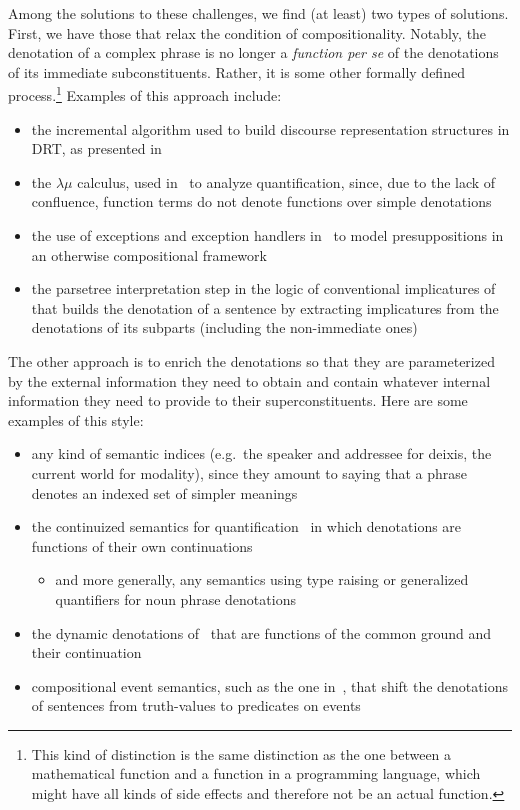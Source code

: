 \documentclass{llncs}
\begin{document}
Among the solutions to these challenges, we find (at least) two types of
solutions. First, we have those that relax the condition of
compositionality. Notably, the denotation of a complex phrase is no longer
a \emph{function per se} of the denotations of its immediate
subconstituents. Rather, it is some other formally defined
process.\footnote{This kind of distinction is the same distinction as the
  one between a mathematical function and a function in a programming
  language, which might have all kinds of side effects and therefore not be
  an actual function.} Examples of this approach include:

\begin{itemize}
\item the incremental algorithm used to build discourse representation
  structures in DRT, as presented in~\cite{kamp1993discourse}
\item the $\lambda\mu$ calculus, used in~\cite{de2001type} to analyze
  quantification, since, due to the lack of confluence, function terms do
  not denote functions over simple denotations
\item the use of exceptions and exception handlers
  in~\cite{lebedeva2012expression} to model presuppositions in an otherwise
  compositional framework
\item the parsetree interpretation step in the logic of conventional
  implicatures of~\cite{potts2005logic} that builds the denotation of a
  sentence by extracting implicatures from the denotations of its subparts
  (including the non-immediate ones)
\end{itemize}

The other approach is to enrich the denotations so that they are
parameterized by the external information they need to obtain and contain
whatever internal information they need to provide to their
superconstituents. Here are some examples of this style:

\begin{itemize}
\item any kind of semantic indices (e.g.\ the speaker and addressee for
  deixis, the current world for modality), since they amount to saying that
  a phrase denotes an indexed set of simpler meanings
\item the continuized semantics for
  quantification~\cite{barker2002continuations} in which denotations are
  functions of their own continuations
  \begin{itemize}
  \item and more generally, any semantics using type raising or generalized
    quantifiers for noun phrase denotations
  \end{itemize}
\item the dynamic denotations of~\cite{de2006towards} that are functions of
  the common ground and their continuation
\item compositional event semantics, such as the one
  in~\cite{qian2011event}, that shift the denotations of sentences from
  truth-values to predicates on events
\end{itemize}
\end{document}
